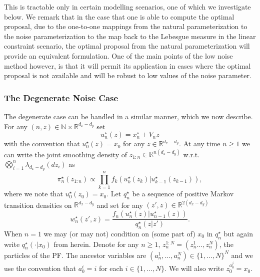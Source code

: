 \documentclass[english,13pt]{article}
\numberwithin{equation}{section}
\begin{document}
This is tractable only in certain modelling scenarios, one of which we investigate below.  We remark that in the case that one
is able to compute the optimal proposal,  due to the one-to-one mappings from the natural parameterization to the noise parameterization to the map back to the Lebesgue measure in the linear constraint scenario,  the optimal proposal from the natural parameterization will provide an equivalent formulation.  One of the main points of the low noise method however,  is that it will permit its application in cases where the optimal proposal is not available and will be robust to low values of the noise parameter.

\subsubsection{The Degenerate Noise Case}\label{sec:dn_add}

The degenerate case can be handled in a similar manner,  which we now describe.
For any $(n,z)\in\mathbb{N}\times\mathbb{R}^{d_x-d_y}$ set
$$
u_n^{\star}(z) = x_n^{\star} + V_n z
$$
with the convention that $u_0^{\star}(z)=x_0$ for any $z\in \mathbb{R}^{d_x-d_y}$.
At any time $n\geq 1$ we can write the joint smoothing density of $z_{1:n}\in\mathbb{R}^{n(d_x-d_y)}$ w.r.t.~$\bigotimes_{i=1}^n \lambda_{d_x-d_y}(dz_i)$ as 
$$
\pi_n^{\star}(z_{1:n}) \propto \prod_{k=1}^n 
f_k(u_k^{\star}(z_k)|u_{k-1}^{\star}(z_{k-1})),
$$
where we note that $u_{0}^{\star}(z_{0}) = x_0$. Let $q_n^{\star}$ be a sequence of positive Markov transition densities on $\mathbb{R}^{d_x-d_y}$ and set for any $(z',z)\in\mathbb{R}^{2(d_x-d_y)}$
$$
w_n^{\star}(z',z) = \frac{
f_n(u_n^{\star}(z)|u_{n-1}^{\star}(z))}{q_n^{\star}(z|z')}.
$$
When $n=1$ we may (or may not) condition on (some part of) $x_0$
in $q_n^{\star}$ but again write $q_n^{\star}(\cdot|x_0)$ from herein.  Denote for any $n\geq 1$,  $z_n^{1:N}=(z_n^{1}\dots,z_n^{N})$, the particles of the PF.   The ancestor variables are $(a_n^1,\dots,a_n^N)\in\{1,\dots,N\}^N$ and we use the convention that $a_0^i=i$ for each $i\in\{1,\dots,N\}$.  We will also write $z_{0}^{a_{0}^j}=x_0$.
\end{document}

